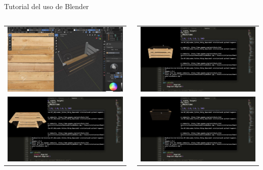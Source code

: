 \begin{frame}{Tutorial del uso de Blender \footnotemark}
\begin{columns}
\begin{column}{0.23\textwidth}
\begin{center}
\begin{tabular}{c}
		        \includegraphics[width=0.75\linewidth]{Figs/VideoBlender08}\\
		        \includegraphics[width=0.75\linewidth]{Figs/VideoBlender09}\\
	    \end{tabular}
    \end{center}	
\end{column}
\begin{column}{0.23\textwidth}
    \begin{center}
	    \begin{tabular}{c}
		        \includegraphics[width=0.75\linewidth]{Figs/VideoBlender10}\\
		        \includegraphics[width=0.75\linewidth]{Figs/VideoBlender11}\\

\end{tabular}
\end{center}
\end{column}
\end{columns}
\end{frame}
